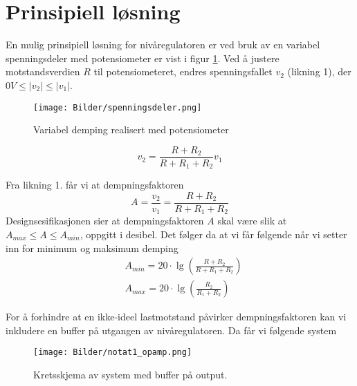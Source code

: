 \section{Prinsipiell løsning}
\label{prinsipiellLoesning}
 

En mulig prinsipiell løsning for nivåregulatoren er ved bruk av en variabel spenningsdeler med potensiometer er vist i figur 
\ref{fig:spenningsdeler}.
Ved å justere motstandsverdien $R$ til potensiometeret, endres spenningsfallet $v_2$ (likning 1), der $0V \leq |v_2| \leq |v_1|$.
\begin{figure}[H]
    \centering
    \texttt{[image: Bilder/spenningsdeler.png]}
    \caption{Variabel demping realisert med potensiometer \cite{teknot}}
    \label{fig:spenningsdeler}
\end{figure}


\begin{equation}
    v_2 = \frac{R + R_2}{R + R_1 + R_2}v_1
\end{equation}

Fra likning 1. får vi at dempningsfaktoren
\[
    A = \frac{v_2}{v_1} = \frac{R + R_2}{R + R_1 + R_2}
\]
Designsesifikasjonen sier at dempningsfaktoren $A$ skal være slik at
$A_{max} \leq A \leq A_{min}$, oppgitt i desibel. Det følger da at 
vi får følgende når vi setter inn for minimum og maksimum demping
\begin{align}
    &A_{min} = 20 \cdot \lg{\left(\frac{R + R_2}{R + R_1 + R_2}\right)}\\ 
    &A_{max} = 20 \cdot \lg{\left(\frac{R_2}{R_1 + R_2}\right)}  
\end{align}

For å forhindre at en ikke-ideel lastmotstand påvirker dempningsfaktoren kan vi 
inkludere en buffer på utgangen av nivåregulatoren. Da får vi følgende system

\begin{figure}[H]
    \centering 
    \texttt{[image: Bilder/notat1\_opamp.png]}
    \caption{Kretsskjema av system med buffer på output.}
\end{figure}
